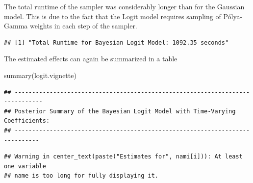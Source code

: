 \documentclass[a4paper, preprint, 3p,
authoryear]{elsarticle} %
\newenvironment{Shaded}{\begin{snugshade}}{\end{snugshade}}
\newcommand{\NormalTok}[1]{#1}
\begin{document}
The total runtime of the sampler was considerably longer than for the
Gaussian model. This is due to the fact that the Logit model requires
sampling of Pólya-Gamma weights in each step of the sampler.

\begin{Shaded}
\end{Shaded}

\begin{verbatim}
## [1] "Total Runtime for Bayesian Logit Model: 1092.35 seconds"
\end{verbatim}

The estimated effects can again be summarized in a table

\begin{Shaded}
\begin{Highlighting}[]
\NormalTok{summary(logit.vignette)}
\end{Highlighting}
\end{Shaded}

\begin{verbatim}
## ------------------------------------------------------------------------------
## Posterior Summary of the Bayesian Logit Model with Time-Varying Coefficients:
## -----------------------------------------------------------------------------
\end{verbatim}

\begin{verbatim}
## Warning in center_text(paste("Estimates for", nami[i])): At least one variable
## name is too long for fully displaying it.
\end{verbatim}
\end{document}
